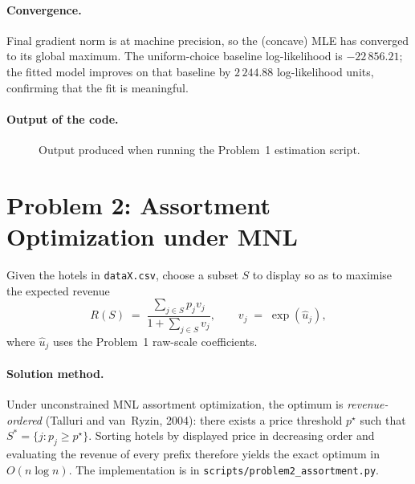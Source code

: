 \documentclass[11pt]{article}
\begin{document}
\paragraph{Convergence.}
Final gradient norm is at machine precision, so the (concave) MLE has
converged to its global maximum. The uniform-choice baseline log-likelihood
is $-22\,856.21$; the fitted model improves on that baseline by $2\,244.88$
log-likelihood units, confirming that the fit is meaningful.

\paragraph{Output of the code.}
\begin{figure}[h!]
  \centering
  \caption{Output produced when running the Problem~1 estimation script.}
\end{figure}

\FloatBarrier
\newpage

\section*{Problem 2: Assortment Optimization under MNL}
\label{sec:p2}

Given the hotels in \texttt{dataX.csv}, choose a subset $S$ to display so as
to maximise the expected revenue
\[
R(S) \;=\; \frac{\sum_{j \in S} p_j v_j}{1 + \sum_{j \in S} v_j},
\qquad
v_j \;=\; \exp(\hat u_j),
\]
where $\hat u_j$ uses the Problem~1 raw-scale coefficients.

\paragraph{Solution method.}
Under unconstrained MNL assortment optimization, the optimum is
\emph{revenue-ordered} (Talluri and van~Ryzin, 2004): there exists a price
threshold $p^\star$ such that $S^* = \{j : p_j \ge p^\star\}$.
Sorting hotels by displayed price in decreasing order and evaluating the
revenue of every prefix therefore yields the exact optimum in
$O(n \log n)$. The implementation is in
\texttt{scripts/problem2\_assortment.py}.
\end{document}
